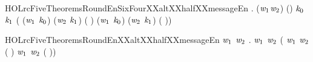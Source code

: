 \newcommand{\HOLrcFiveTheoremsRoundEnYYXXcompute}{\UseVerbatim{HOLrcFiveTheoremsRoundEnYYXXcompute}}
\begin{SaveVerbatim}{HOLrcFiveTheoremsRoundEnSixFourXXaltXXhalfXXmessageEn}
\HOLTokenTurnstile{} \HOLSymConst{\HOLTokenForall{}}  .
     (\ensuremath{\HOLFreeVar{w}\sb{\mathrm{1}}}\HOLSymConst{,}\ensuremath{\HOLFreeVar{w}\sb{\mathrm{2}}}) \HOLSymConst{=}   \HOLSymConst{\HOLTokenConj{}} (\HOLSymConst{,}\HOLSymConst{,}\HOLSymConst{,}\HOLSymConst{,}\HOLSymConst{,}) \HOLSymConst{=}    \HOLSymConst{\HOLTokenConj{}}
     \ensuremath{\HOLFreeVar{k}\sb{\mathrm{0}}} \HOLSymConst{=}    \HOLSymConst{\HOLTokenConj{}} \ensuremath{\HOLFreeVar{k}\sb{\mathrm{1}}} \HOLSymConst{=}    \HOLSymConst{\HOLTokenImp{}}
         \HOLSymConst{=}
       ( (\ensuremath{\HOLFreeVar{w}\sb{\mathrm{1}}} \HOLSymConst{\ensuremath{+}} \ensuremath{\HOLFreeVar{k}\sb{\mathrm{0}}}) (\ensuremath{\HOLFreeVar{w}\sb{\mathrm{2}}} \HOLSymConst{\ensuremath{+}} \ensuremath{\HOLFreeVar{k}\sb{\mathrm{1}}})  ( \HOLSymConst{\HOLTokenProd{}} )\HOLSymConst{,}
         (\ensuremath{\HOLFreeVar{w}\sb{\mathrm{1}}} \HOLSymConst{\ensuremath{+}} \ensuremath{\HOLFreeVar{k}\sb{\mathrm{0}}}) (\ensuremath{\HOLFreeVar{w}\sb{\mathrm{2}}} \HOLSymConst{\ensuremath{+}} \ensuremath{\HOLFreeVar{k}\sb{\mathrm{1}}})  ( \HOLSymConst{\HOLTokenProd{}}  \HOLSymConst{\ensuremath{+}} ))
\end{SaveVerbatim}
\newcommand{\HOLrcFiveTheoremsRoundEnSixFourXXaltXXhalfXXmessageEn}{\UseVerbatim{HOLrcFiveTheoremsRoundEnSixFourXXaltXXhalfXXmessageEn}}
\begin{SaveVerbatim}{HOLrcFiveTheoremsRoundEnXXaltXXhalfXXmessageEn}
\HOLTokenTurnstile{} \HOLSymConst{\HOLTokenForall{}}\ensuremath{\HOLBoundVar{w}\sb{\mathrm{1}}} \ensuremath{\HOLBoundVar{w}\sb{\mathrm{2}}}  .
       \ensuremath{\HOLBoundVar{w}\sb{\mathrm{1}}} \ensuremath{\HOLBoundVar{w}\sb{\mathrm{2}}}  \HOLSymConst{=}
     ( \ensuremath{\HOLBoundVar{w}\sb{\mathrm{1}}} \ensuremath{\HOLBoundVar{w}\sb{\mathrm{2}}}  ( \HOLSymConst{\HOLTokenProd{}} )\HOLSymConst{,}
       \ensuremath{\HOLBoundVar{w}\sb{\mathrm{1}}} \ensuremath{\HOLBoundVar{w}\sb{\mathrm{2}}}  ( \HOLSymConst{\HOLTokenProd{}}  \HOLSymConst{\ensuremath{+}} ))
\end{SaveVerbatim}

